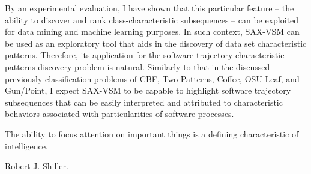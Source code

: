 By an experimental evaluation, I have shown that this particular feature 
-- the ability to discover and rank class-characteristic subsequences -- 
can be exploited for data mining and machine learning purposes. In such context, SAX-VSM can be used as an 
exploratory tool that aids in the discovery of data set characteristic patterns. 
Therefore, its application for the software trajectory characteristic patterns discovery problem is natural. 
Similarly to that in the discussed previously classification problems of CBF, Two Patterns, Coffee, OSU Leaf, and Gun/Point, 
I expect SAX-VSM to be capable to highlight software trajectory subsequences that can be easily interpreted 
and attributed to characteristic behaviors associated with particularities of software processes.
%

\epigraph{The ability to focus attention on important things is a defining characteristic of 
intelligence.}{Robert J. Shiller.}
